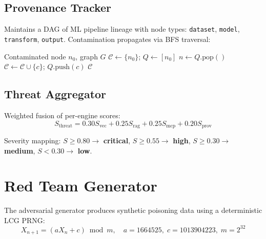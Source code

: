 \documentclass[11pt,twocolumn]{article}
\begin{document}
\subsection{Provenance Tracker}

Maintains a DAG of ML pipeline lineage with node types: \texttt{dataset}, \texttt{model}, \texttt{transform}, \texttt{output}. Contamination propagates via BFS traversal:

\begin{algorithm}[h]
\caption{Contamination Propagation}
\label{alg:contamination}
\begin{algorithmic}[1]
\Require Contaminated node $n_0$, graph $G$
\State $\mathcal{C} \gets \{n_0\}$; $Q \gets [n_0]$
  \State $n \gets Q.\text{pop}()$
      \State $\mathcal{C} \gets \mathcal{C} \cup \{c\}$; $Q.\text{push}(c)$
    \EndIf
  \EndFor
\EndWhile
\State \Return $\mathcal{C}$
\end{algorithmic}
\end{algorithm}

\subsection{Threat Aggregator}

Weighted fusion of per-engine scores:
\begin{equation}
S_{\text{threat}} = 0.30 S_{\text{vec}} + 0.25 S_{\text{rag}} + 0.25 S_{\text{mcp}} + 0.20 S_{\text{prov}}
\label{eq:fusion}
\end{equation}

Severity mapping: $S \geq 0.80 \to$ \textcolor{danger}{\textbf{critical}}, $S \geq 0.55 \to$ \textcolor{amber}{\textbf{high}}, $S \geq 0.30 \to$ \textcolor{accent}{\textbf{medium}}, $S < 0.30 \to$ \textcolor{emerald}{\textbf{low}}.

\section{Red Team Generator}
\label{sec:generator}

The adversarial generator produces synthetic poisoning data using a deterministic LCG PRNG:
\begin{equation}
X_{n+1} = (aX_n + c) \bmod m, \quad a\!=\!1664525, \; c\!=\!1013904223, \; m\!=\!2^{32}
\label{eq:lcg}
\end{equation}
\end{document}
